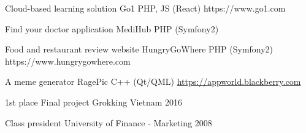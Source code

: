 \documentclass[]{awesome-cv}
\begin{document}
\vspace{-7mm}
\begin{cventries}
	\cventry
	{Cloud-based learning solution}
	{Go1}
	{PHP, JS (React)}
	{https://www.go1.com}
	{}

	\vspace{-5mm}
	\cventry
	{Find your doctor application}
	{MediHub}
	{PHP (Symfony2)}
	{}
	{}

	\vspace{-5mm}
	\cventry
	{Food and restaurant review website}
	{HungryGoWhere}
	{PHP (Symfony2)}
	{https://www.hungrygowhere.com}
	{}

	\vspace{-5mm}
	\cventry
	{A meme generator}
	{RagePic}
	{C++ (Qt/QML)}
	{\href{https://appworld.blackberry.com/webstore/content/20401932}{https://appworld.blackberry.com}}
	{}

	\vspace{-5mm}
\end{cventries}
\begin{cvhonors}
	\cvhonor
	{1st place}
	{Final project}
	{Grokking Vietnam}
	{2016}

	\cvhonor
	{Class president}
	{University of Finance - Marketing}
	{}
	{2008}
\end{cvhonors}
\ 
\end{document}
